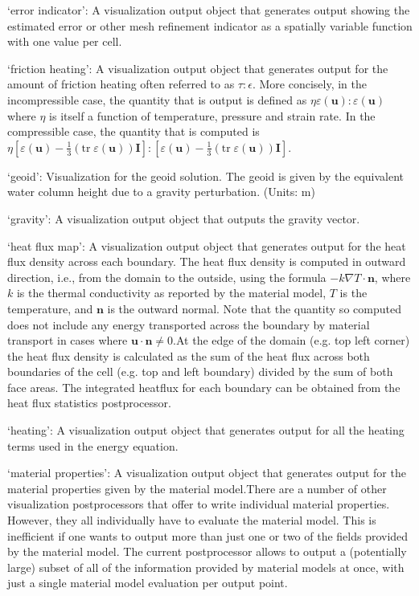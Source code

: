 \begin{itemize}
`error indicator': A visualization output object that generates output showing the estimated error or other mesh refinement indicator as a spatially variable function with one value per cell.

`friction heating': A visualization output object that generates output for the amount of friction heating often referred to as $\tau:\epsilon$. More concisely, in the incompressible case, the quantity that is output is defined as $\eta \varepsilon(\mathbf u):\varepsilon(\mathbf u)$ where $\eta$ is itself a function of temperature, pressure and strain rate. In the compressible case, the quantity that is computed is $\eta [\varepsilon(\mathbf u)-\tfrac 13(\textrm{tr}\;\varepsilon(\mathbf u))\mathbf I]:[\varepsilon(\mathbf u)-\tfrac 13(\textrm{tr}\;\varepsilon(\mathbf u))\mathbf I]$.

`geoid': Visualization for the geoid solution. The geoid is given by the equivalent water column height due to a gravity perturbation. (Units: m)

`gravity': A visualization output object that outputs the gravity vector.

`heat flux map': A visualization output object that generates output for the heat flux density across each boundary. The heat flux density is computed in outward direction, i.e., from the domain to the outside, using the formula $-k \nabla T \cdot \mathbf n$, where $k$ is the thermal conductivity as reported by the material model, $T$ is the temperature, and $\mathbf n$ is the outward normal. Note that the quantity so computed does not include any energy transported across the boundary by material transport in cases where $\mathbf u \cdot \mathbf n \neq 0$.At the edge of the domain (e.g. top left corner) the heat flux density is calculated as the sum of the heat flux across both boundaries of the cell (e.g. top and left boundary) divided by the sum of both face areas. The integrated heatflux for each boundary can be obtained from the heat flux statistics postprocessor.

`heating': A visualization output object that generates output for all the heating terms used in the energy equation.

`material properties': A visualization output object that generates output for the material properties given by the material model.There are a number of other visualization postprocessors that offer to write individual material properties. However, they all individually have to evaluate the material model. This is inefficient if one wants to output more than just one or two of the fields provided by the material model. The current postprocessor allows to output a (potentially large) subset of all of the information provided by material models at once, with just a single material model evaluation per output point.


\end{itemize}
